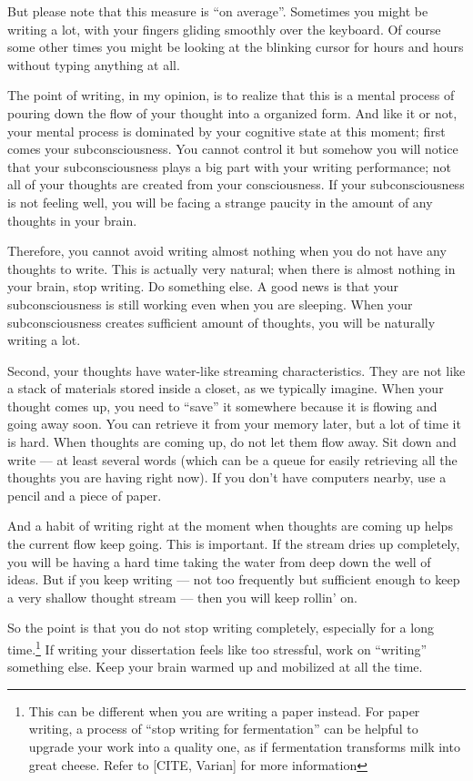 \documentclass[11pt]{article}
\begin{document}
But please note that this measure is ``on average''. Sometimes you
might be writing a lot, with your fingers gliding smoothly over the keyboard.
Of course some other times you might be looking at the blinking
cursor for hours and hours without typing anything at all. 

The point of writing, in my opinion, is to realize that this is a
mental process of pouring down the flow of your thought into a
organized form.  And like it or not, your mental process is
dominated by your cognitive state at this moment; first comes your
subconsciousness. You cannot control it but somehow you will
notice that your subconsciousness plays a big part with your
writing performance; not all of your thoughts are created from
your consciousness. If your subconsciousness is not feeling well,
you will be facing a strange paucity in the amount of any thoughts
in your brain.

Therefore, you cannot avoid writing almost nothing when you do not
have any thoughts to write. This is actually very natural; when
there is almost nothing in your brain, stop writing. Do something
else. A good news is that your subconsciousness is still working
even when you are sleeping.  When your subconsciousness creates
sufficient amount of thoughts, you will be naturally writing a
lot. 

Second, your thoughts have water-like streaming characteristics.
They are not like a stack of materials stored inside a closet, as
we typically imagine.  When your thought comes up, you need to
``save'' it somewhere because it is flowing and going away soon.
You can retrieve it from your memory later, but a lot of time it
is hard. When thoughts are coming up, do not let them flow away.
Sit down and write --- at least several words (which can be a
queue for easily retrieving all the thoughts you are having right
now). If you don't have computers nearby, use a pencil and a piece
of paper. 

And a habit of writing right at the moment when thoughts are
coming up helps the current flow keep going. This is important. If
the stream dries up completely, you will be having a hard time
taking the water from deep down the well of ideas.  But if you
keep writing --- not too frequently but sufficient enough to keep
a very shallow thought stream --- then you will keep rollin' on.

So the point is that you do not stop writing completely,
especially for a long time.\footnote{This can be different when
    you are writing a paper instead. For paper writing, a process
    of ``stop writing for fermentation'' can be helpful to upgrade
    your work into a quality one, as if fermentation transforms milk
into great cheese. Refer to [CITE, Varian] for more information}
If writing your dissertation feels like too stressful, work on
``writing'' something else. Keep your brain warmed up and
mobilized at all the time.
\end{document}
